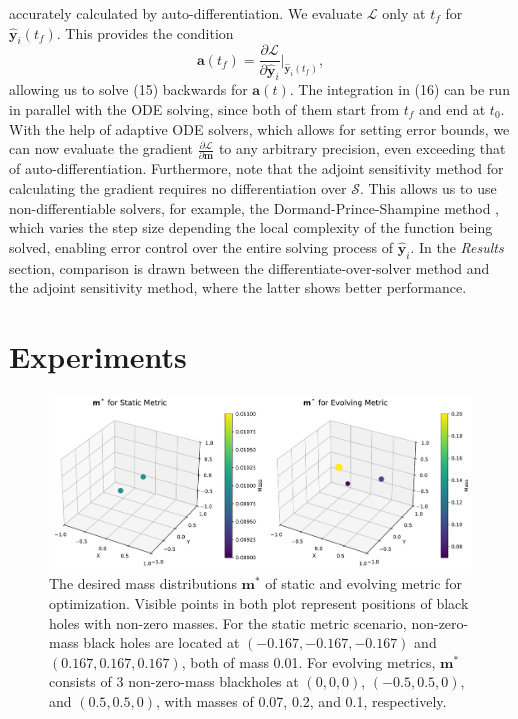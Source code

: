 \documentclass[conference]{IEEEtran}
\begin{document}
accurately calculated by auto-differentiation. We evaluate 
$\mathcal{L}$ only at $t_f$ for $\hat{\mathbf{y}}_i(t_f)$. This provides 
the condition 
\[
\mathbf{a}(t_f) = \frac{\partial \mathcal{L}}{\partial \hat{\mathbf{y}}_i} 
\Big|_{\hat{\mathbf{y}}_i(t_f)},
\]
allowing us to solve (15) backwards for $\mathbf{a}(t)$. The integration in 
(16) can be run in parallel with the ODE solving, since both of them 
start from $t_f$ and end at $t_0$. With the help of adaptive ODE solvers, 
which allows for setting error bounds, we can now evaluate the gradient 
$\frac{\partial \mathcal{L}}{\partial \mathbf{m}}$ to any arbitrary precision, 
even exceeding that of auto-differentiation. Furthermore, note that the 
adjoint sensitivity method for calculating the gradient requires no 
differentiation over $\mathcal{S}$. This allows us to use non-differentiable 
solvers, for example, the Dormand-Prince-Shampine method \cite{dpsrk}, which varies the 
step size depending the local complexity of the function being solved, enabling 
error control over the entire solving process of $\hat{\mathbf{y}}_i$. 
In the \textit{Results} section, comparison is drawn between the 
differentiate-over-solver method and the adjoint sensitivity method, where 
the latter shows better performance.

\section{Experiments}

\begin{figure}[htbp]
\centerline{\includegraphics[width=\columnwidth]{scatter_plot.pdf}}
\caption{The desired mass distributions $\mathbf{m}^*$ of 
static and evolving metric for optimization. Visible points 
in both plot represent positions of black holes with non-zero 
masses. For the static metric scenario, non-zero-mass black holes 
are located at $(-0.167, -0.167, -0.167)$ and $(0.167, 0.167, 0.167)$, both 
of mass 0.01. For evolving metrics, $\mathbf{m}^*$ consists of 
3 non-zero-mass blackholes at $(0, 0, 0)$, $(-0.5, 0.5, 0)$, and $(0.5, 0.5, 0)$, 
with masses of 0.07, 0.2, and 0.1, respectively.}
\label{fig}
\end{figure}
\end{document}
